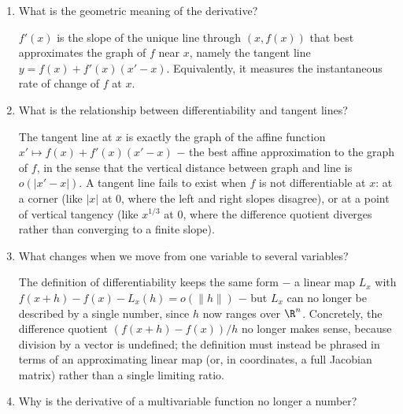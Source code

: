 \documentclass{self-check}
\begin{document}
\begin{enumerate}[leftmargin=*, itemsep=8pt]
\begin{answer}
      The defining property is the existence of a linear map \(df_{x}\) making the error \(f(x+h)-f(x)-df_{x}(h)\) vanish faster than \(h\); ``slope'' is merely the coefficient that happens to characterize the unique linear map when there is one variable. In higher dimensions there is no single number that could be called ``the slope'' \(-\) only the approximating linear map has invariant meaning \(-\) so approximation, not slope, is the primitive notion, and it is the one that generalizes.
    \end{answer}
  \item What is the geometric meaning of the derivative?
    \begin{answer}
      \(f'(x)\) is the slope of the unique line through \((x,f(x))\) that best approximates the graph of \(f\) near \(x\), namely the tangent line \(y=f(x)+f'(x)(x'-x)\). Equivalently, it measures the instantaneous rate of change of \(f\) at \(x\).
    \end{answer}
  \item What is the relationship between differentiability and tangent lines?
    \begin{answer}
      The tangent line at \(x\) is exactly the graph of the affine function \(x'\mapsto f(x)+f'(x)(x'-x)\) \(-\) the best affine approximation to the graph of \(f\), in the sense that the vertical distance between graph and line is \(o(|x'-x|)\). A tangent line fails to exist when \(f\) is not differentiable at \(x\): at a corner (like \(|x|\) at \(0\), where the left and right slopes disagree), or at a point of vertical tangency (like \(x^{1/3}\) at \(0\), where the difference quotient diverges rather than converging to a finite slope).
    \end{answer}
  \item What changes when we move from one variable to several variables?
    \begin{answer}
      The definition of differentiability keeps the same form \(-\) a linear map \(L_{x}\) with \(f(x+h)-f(x)-L_{x}(h)=o(\|h\|)\) \(-\) but \(L_{x}\) can no longer be described by a single number, since \(h\) now ranges over \(\R^{n}\). Concretely, the difference quotient \((f(x+h)-f(x))/h\) no longer makes sense, because division by a vector is undefined; the definition must instead be phrased in terms of an approximating linear map (or, in coordinates, a full Jacobian matrix) rather than a single limiting ratio.
    \end{answer}
  \item Why is the derivative of a multivariable function no longer a number?

\end{enumerate}
\end{document}
